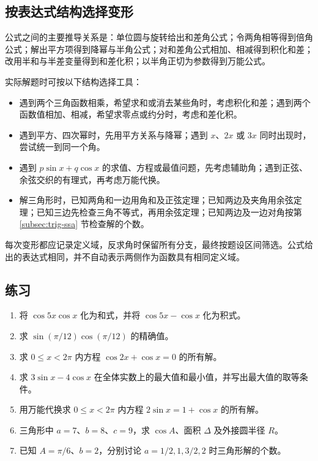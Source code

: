 \documentclass[UTF8,12pt,a4paper,fontset=fandol]{ctexart}
\begin{document}
\subsection{按表达式结构选择变形}

公式之间的主要推导关系是：单位圆与旋转给出和差角公式；令两角相等得到倍角公式；解出平方项得到降幂与半角公式；对和差角公式相加、相减得到积化和差；改用半和与半差变量得到和差化积；以半角正切为参数得到万能公式。

实际解题时可按以下结构选择工具：
\begin{itemize}
  \item 遇到两个三角函数相乘，希望求和或消去某些角时，考虑积化和差；遇到两个函数值相加、相减，希望求零点或约分时，考虑和差化积。
  \item 遇到平方、四次幂时，先用平方关系与降幂；遇到 $x$、$2x$ 或 $3x$ 同时出现时，尝试统一到同一个角。
  \item 遇到 $p\sin x+q\cos x$ 的求值、方程或最值问题，先考虑辅助角；遇到正弦、余弦交织的有理式，再考虑万能代换。
  \item 解三角形时，已知两角和一边用角和及正弦定理；已知两边及夹角用余弦定理；已知三边先检查三角不等式，再用余弦定理；已知两边及一边对角按第 \ref{subsec:trig-ssa} 节检查解的个数。
\end{itemize}
每次变形都应记录定义域，反求角时保留所有分支，最终按题设区间筛选。公式给出的表达式相同，并不自动表示两侧作为函数具有相同定义域。

\subsection{练习}

\begin{enumerate}
  \item 将 $\cos5x\cos x$ 化为和式，并将 $\cos5x-\cos x$ 化为积式。
  \item 求 $\sin(\pi/12)\cos(\pi/12)$ 的精确值。
  \item 求 $0\le x<2\pi$ 内方程 $\cos2x+\cos x=0$ 的所有解。
  \item 求 $3\sin x-4\cos x$ 在全体实数上的最大值和最小值，并写出最大值的取等条件。
  \item 用万能代换求 $0\le x<2\pi$ 内方程 $2\sin x=1+\cos x$ 的所有解。
  \item 三角形中 $a=7$、$b=8$、$c=9$，求 $\cos A$、面积 $\Delta$ 及外接圆半径 $R$。
  \item 已知 $A=\pi/6$、$b=2$，分别讨论 $a=1/2,1,3/2,2$ 时三角形解的个数。
\end{enumerate}
\end{document}
